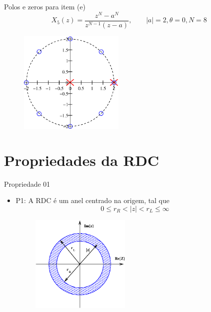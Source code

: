 \begin{slide}{Polos e zeros para item (e)}
   \begin{equation*}
      X_5(z)=\frac{z^N-a^N}{z^{N-1}(z-a)},\qquad  |a| = 2, \theta = 0, N=8
   \end{equation*}
   \begin{figure}
      \centering
      \includegraphics[width=0.45\textwidth]{figs/ex5.eps}
   \end{figure}
\end{slide}

\section[slide=true]{Propriedades da RDC}
\begin{slide}{Propriedade 01}
\begin{itemize}
   \item P1: A RDC é um anel centrado na origem, tal que
   \begin{equation*}
      0\leq r_R < |z| < r_L \leq\infty
   \end{equation*}
   \begin{figure}
      \centering
      \includegraphics[width=0.45\textwidth]{figs/p1.eps}
   \end{figure}
\end{itemize}
\end{slide}

